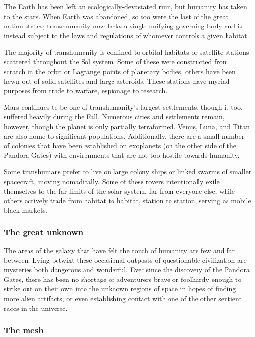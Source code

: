 The Earth has been left an ecologically-devastated ruin, but humanity has taken to the stars. When Earth was abandoned, so too were the last of the great nation-states; transhumanity now lacks a single unifying governing body and is instead subject to the laws and regulations of whomever controls a given habitat.

The majority of transhumanity is confined to orbital habitats or satellite stations scattered throughout the Sol system. Some of these were constructed from scratch in the orbit or Lagrange points of planetary bodies, others have been hewn out of solid satellites and large asteroids. These stations have myriad purposes from trade to warfare, espionage to research.

Mars continues to be one of transhumanity's largest settlements, though it too, suffered heavily during the Fall. Numerous cities and settlements remain, however, though the planet is only partially terraformed. Venus, Luna, and Titan are also home to significant populations. Additionally, there are a small number of colonies that have been established on exoplanets (on the other side of the Pandora Gates) with environments that are not too hostile towards humanity.

Some transhumans prefer to live on large colony ships or linked swarms of smaller spacecraft, moving nomadically. Some of these rovers intentionally exile themselves to the far limits of the solar system, far from everyone else, while others actively trade from habitat to habitat, station to station, serving as mobile black markets.


\subsubsection{The great unknown}
\label{sec:great-unknown}

The areas of the galaxy that have felt the touch of humanity are few and far between. Lying betwixt these occasional outposts of questionable civilization are mysteries both dangerous and wonderful. Ever since the discovery of the Pandora Gates, there has been no shortage of adventurers brave or foolhardy enough to strike out on their own into the unknown regions of space in hopes of finding more alien artifacts, or even establishing contact with one of the other sentient races in the universe.


\subsubsection{The mesh}
\label{sec:mesh}


